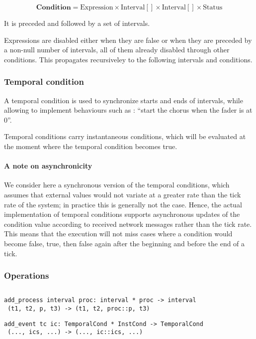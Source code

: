 \documentclass[applsci,article,submit,moreauthors,pdftex,10pt,a4paper]{mdpi}
\begin{document}
\[
\mathbf{Condition} = \mathrm{Expression} \times \mathrm{Interval}[] \times \mathrm{Interval}[] \times \mathrm{Status}
\]

It is preceded and followed by a set of intervals.

Expressions are disabled either when they are false or when they are preceded by a non-null number of intervals, all of them already disabled through other conditions. This propagates recursiveley to the following intervals and conditions. 

\subsubsection{Temporal condition}
A temporal condition is used to synchronize starts and ends of intervals, while allowing to implement behaviours such as : ``start the chorus when the fader is at 0''.

Temporal conditions carry instantaneous conditions, which will be evaluated at the moment where the temporal condition becomes true.

\paragraph{A note on asynchronicity}
We consider here a synchronous version of the temporal conditions, which assumes that external values would not variate at a greater rate than the tick rate of the system; in practice this is generally not the case. Hence, the actual implementation of temporal conditions supports asynchronous updates of the condition value according to received network messages rather than the tick rate. 
This means that the execution will not miss cases where a condition would become false, true, then false again after the beginning and before the end of a tick.

\subsubsection{Operations}
\begin{lstlisting}

\end{lstlisting}
\begin{lstlisting}
add_process interval proc: interval * proc -> interval
 (t1, t2, p, t3) -> (t1, t2, proc::p, t3)
\end{lstlisting}

\begin{lstlisting}
add_event tc ic: TemporalCond * InstCond -> TemporalCond
 (..., ics, ...) -> (..., ic::ics, ...)
\end{lstlisting}
\end{document}
